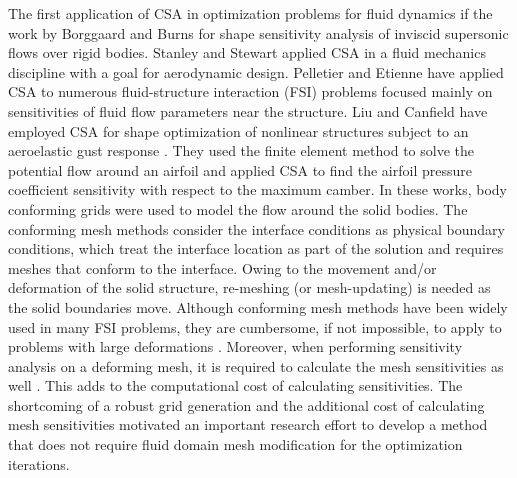 The first application of CSA in optimization problems for fluid dynamics if the work by Borggaard and Burns \cite{borggaard1995sensitivity} for shape sensitivity analysis of inviscid supersonic flows over rigid bodies. Stanley and Stewart \cite{stanley2002design} applied CSA in a fluid mechanics discipline with a goal for aerodynamic design. Pelletier and Etienne have applied CSA to numerous fluid-structure interaction (FSI) problems \cite{etienne2005general} focused mainly on sensitivities of fluid flow parameters near the structure. Liu and Canfield have employed CSA for shape optimization of nonlinear structures subject to an aeroelastic gust response \cite{liu2013equivalence}. They used the finite element method to solve the potential flow around an airfoil and applied CSA to find the airfoil pressure coefficient sensitivity with respect to the maximum camber. In these works, body conforming grids were used to model the flow around the solid bodies. The conforming mesh methods consider the interface conditions as physical boundary conditions, which treat the interface location as part of the solution and requires meshes that conform to the interface. Owing to the movement and/or deformation of the solid structure, re-meshing (or mesh-updating) is needed as the solid boundaries move. Although conforming mesh methods have been widely used in many FSI problems, they are cumbersome, if not impossible, to apply to problems with large deformations \cite{sahin2009arbitrary}. Moreover, when performing sensitivity analysis on a deforming mesh, it is required to calculate the mesh sensitivities as well \cite{liu2013boundary}. This adds to the computational cost of calculating  sensitivities. The shortcoming of a robust grid generation and the additional cost of calculating mesh sensitivities motivated an important research effort to develop a method that does not require fluid domain mesh modification for the optimization iterations.
